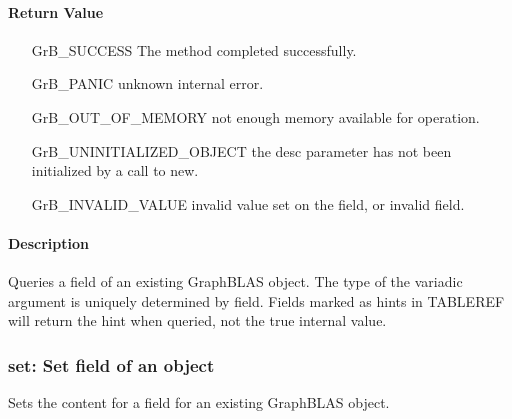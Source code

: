 \paragraph{Return Value}

\begin{itemize}[leftmargin=2.1in]
\item[{\sf GrB\_SUCCESS}]  The method completed successfully.
\item[{\sf GrB\_PANIC}]             unknown internal error.
\item[{\sf GrB\_OUT\_OF\_MEMORY}]          not enough memory available for operation.
\item[{\sf GrB\_UNINITIALIZED\_OBJECT}]          the {\sf desc} parameter has not been
                                    initialized by a call to {\sf new}.
\item[{\sf GrB\_INVALID\_VALUE}]    invalid value set on the field, or invalid field.
\end{itemize}

\paragraph{Description}

Queries a field of an existing GraphBLAS object. %
The type of the variadic argument is uniquely determined by {\sf field}. 
Fields marked as hints in TABLEREF will return the hint when queried, not
the true internal value.


\subsubsection{{\sf set}: Set field of an object}

Sets the content for a field for an existing GraphBLAS object.

\paragraph{\syntax}

